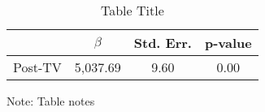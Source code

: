 \noindent 

\begin{table}[H]

\caption{Table Title\label{tab:regression}}

\medskip{}



\begin{centering}

\begin{tabular}{cccc}

\hline 

 & $\beta$ & Std. Err. & p-value\tabularnewline

\hline 

Post-TV & 5,037.69 & 9.60 & 0.00\tabularnewline

\hline 

\end{tabular}

\par\end{centering}

\begin{centering}

\medskip{}

\par\end{centering}

{\footnotesize{}Note: Table notes}{\footnotesize\par}

\end{table}